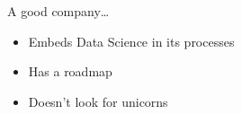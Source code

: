 \begin{frame}{A good company\ldots}
    \large%
    \begin{itemize}
        \setlength{\itemsep}{\medskipamount}
        \item Embeds Data Science in its processes
        \item Has a roadmap
        \item Doesn't look for unicorns
    \end{itemize}
\end{frame}



